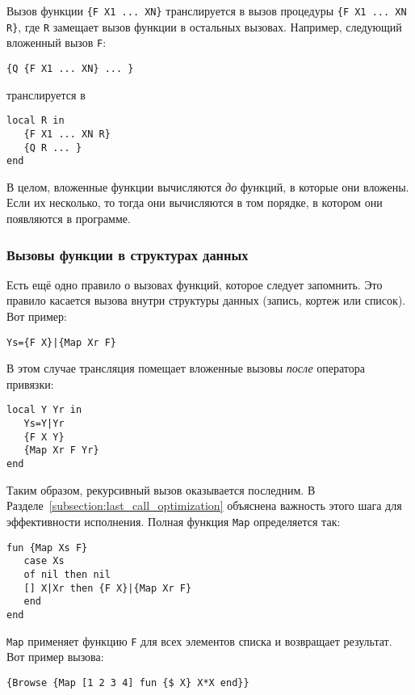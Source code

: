 Вызов функции \lstinline|{F X1 ... XN}| транслируется в вызов процедуры \lstinline|{F X1 ... XN R}|, где \lstinline|R| замещает вызов функции в остальных вызовах. Например, следующий вложенный вызов \lstinline|F|:

\begin{lstlisting}
{Q {F X1 ... XN} ... }
\end{lstlisting}

транслируется в

\begin{lstlisting}
local R in
   {F X1 ... XN R}
   {Q R ... }
end
\end{lstlisting}

В целом, вложенные функции вычисляются \emph{до} функций, в которые они вложены. Если их несколько, то тогда они вычисляются в том порядке, в котором они появляются в программе.

\subsubsection{Вызовы функции в структурах данных}

Есть ещё одно правило о вызовах функций, которое следует запомнить. Это правило касается вызова внутри структуры данных (запись, кортеж или список). Вот пример:

\begin{lstlisting}
Ys={F X}|{Map Xr F}
\end{lstlisting}

В этом случае трансляция помещает вложенные вызовы \emph{после} оператора привязки:

\begin{lstlisting}
local Y Yr in
   Ys=Y|Yr
   {F X Y}
   {Map Xr F Yr}
end
\end{lstlisting}

Таким образом, рекурсивный вызов оказывается последним. В Разделе~\ref{subsection:last_call_optimization} объяснена важность этого шага для эффективности исполнения. Полная функция \lstinline|Map| определяется так:

\begin{lstlisting}
fun {Map Xs F}
   case Xs
   of nil then nil
   [] X|Xr then {F X}|{Map Xr F}
   end
end
\end{lstlisting}

\lstinline|Map| применяет функцию \lstinline|F| для всех элементов списка и возвращает результат. Вот пример вызова:

\begin{lstlisting}[mathescape=false]
{Browse {Map [1 2 3 4] fun {$ X} X*X end}}
\end{lstlisting}

